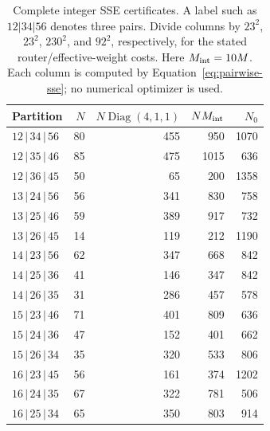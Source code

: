 \begin{table}[t]
\centering\small
\begin{tabular}{lrrrr}
\toprule
Partition & $N$ & $N\operatorname{Diag}(4,1,1)$ & $NM_{\rm int}$ & $N_0$ \\
\midrule
$12\,|\,34\,|\,56$ & 80 & 455 & 950 & 1070 \\
$12\,|\,35\,|\,46$ & 85 & 475 & 1015 & 636 \\
$12\,|\,36\,|\,45$ & 50 & 65 & 200 & 1358 \\
$13\,|\,24\,|\,56$ & 56 & 341 & 830 & 758 \\
$13\,|\,25\,|\,46$ & 59 & 389 & 917 & 732 \\
$13\,|\,26\,|\,45$ & 14 & 119 & 212 & 1190 \\
$14\,|\,23\,|\,56$ & 62 & 347 & 668 & 842 \\
$14\,|\,25\,|\,36$ & 41 & 146 & 347 & 842 \\
$14\,|\,26\,|\,35$ & 31 & 286 & 457 & 578 \\
$15\,|\,23\,|\,46$ & 71 & 401 & 809 & 636 \\
$15\,|\,24\,|\,36$ & 47 & 152 & 401 & 662 \\
$15\,|\,26\,|\,34$ & 35 & 320 & 533 & 806 \\
$16\,|\,23\,|\,45$ & 56 & 161 & 374 & 1202 \\
$16\,|\,24\,|\,35$ & 67 & 322 & 781 & 506 \\
$16\,|\,25\,|\,34$ & 65 & 350 & 803 & 914 \\
\bottomrule\end{tabular}
\caption{Complete integer SSE certificates. A label such as $12|34|56$ denotes three pairs. Divide columns by $23^2$, $23^2$, $230^2$, and $92^2$, respectively, for the stated router/effective-weight costs. Here $M_{\rm int}=10M$. Each column is computed by Equation~\eqref{eq:pairwise-sse}; no numerical optimizer is used.}
\label{tab:decision-certificates}
\end{table}
